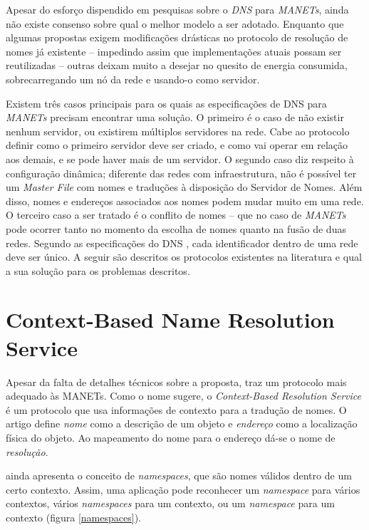 
Apesar do esforço dispendido em pesquisas sobre o \textit{DNS} para \textit{MANETs},
ainda não existe consenso sobre qual o melhor modelo a ser 
adotado. Enquanto que algumas propostas exigem modificações drásticas no 
protocolo de resolução de nomes já existente -- impedindo assim que 
implementações atuais possam ser reutilizadas -- outras deixam muito a desejar 
no quesito de energia consumida, sobrecarregando um nó da rede e usando-o como
 servidor.

Existem três casos principais para os quais as especificações de DNS para 
\textit{MANETs} precisam encontrar uma solução. O primeiro é o caso de não existir 
nenhum servidor, ou existirem múltiplos servidores na rede. Cabe ao protocolo 
definir como o primeiro servidor deve ser criado, e como vai operar em relação 
aos demais, e se pode haver mais de um servidor. O segundo caso diz respeito à 
configuração dinâmica; diferente das redes com infraestrutura, não é possível 
ter um \textit{Master File} com nomes e traduções à disposição do Servidor de 
Nomes. Além disso, nomes e endereços associados aos nomes podem mudar muito em 
uma rede. O terceiro caso a ser tratado é o conflito de nomes -- que no caso de 
\textit{MANETs} pode ocorrer tanto no momento da escolha de nomes quanto na fusão
 de duas redes. Segundo as especificações do DNS \cite{rfc1035}, cada 
 identificador dentro de uma rede deve ser único. A seguir são descritos os 
 protocolos existentes na literatura e qual a sua solução para os problemas descritos.

\section{Context-Based Name Resolution Service}
\label{context-based}

    Apesar da falta de detalhes técnicos sobre a proposta, \cite{context-dns}
    traz um protocolo mais adequado às MANETs. Como o nome
    sugere, o \textit{Context-Based Resolution Service} é um protocolo que usa
    informações de contexto para a tradução de nomes. O artigo define \emph{nome}
    como a descrição de um objeto e \emph{endereço} como a localização física do
    objeto. Ao mapeamento do nome para o endereço dá-se o nome de \emph{resolução}.
    
    \cite{context-dns} ainda apresenta o conceito de \textit{namespaces}, que são
    nomes válidos dentro de um certo contexto. Assim, uma aplicação pode reconhecer
    um \textit{namespace} para vários contextos, vários \textit{namespaces} para
    um contexto, ou um \textit{namespace} para um contexto (figura \ref{namespaces}).
    
